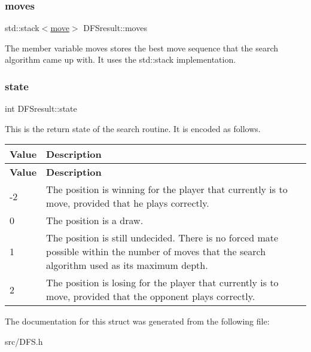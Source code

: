 \subsubsection{\texorpdfstring{moves}{moves}}
{\footnotesize\ttfamily std\+::stack$<$\hyperlink{structmove}{move}$>$ D\+F\+Sresult\+::moves}

The member variable moves stores the best move sequence that the search algorithm came up with. It uses the std\+::stack implementation. \mbox{\label{structDFSresult_a05517437c3e1db1f5b212f2862801b85}} 
\subsubsection{\texorpdfstring{state}{state}}
{\footnotesize\ttfamily int D\+F\+Sresult\+::state}

This is the return state of the search routine. It is encoded as follows. \tabulinesep=1mm
\begin{longtabu} spread 0pt [c]{*{2}{|X[-1]}|}
\hline
\rowcolor{\tableheadbgcolor}\textbf{ Value }&\textbf{ Description  }\\
\endfirsthead
\hline
\endfoot
\hline
\rowcolor{\tableheadbgcolor}\textbf{ Value }&\textbf{ Description  }\\
\endhead
-\/2 &The position is winning for the player that currently is to move, provided that he plays correctly. \\
0 &The position is a draw. \\
1 &The position is still undecided. There is no forced mate possible within the number of moves that the search algorithm used as its maximum depth. \\
2 &The position is losing for the player that currently is to move, provided that the opponent plays correctly. \\
\end{longtabu}


The documentation for this struct was generated from the following file\+:\begin{DoxyCompactItemize}
\item 
src/D\+F\+S.\+h\end{DoxyCompactItemize}
